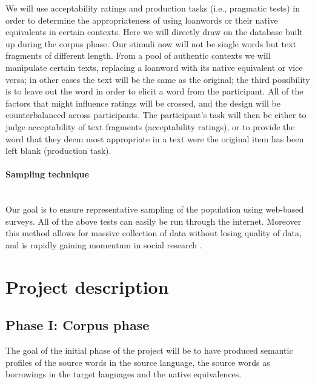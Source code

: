 \documentclass[a4paper]{article}
\begin{document}
We will use acceptability ratings and production tasks (i.e., pragmatic tests) in order to determine the appropriateness of using loanwords or their native equivalents in certain contexts.
Here we will directly draw on the database built up during the corpus phase.
Our stimuli now will not be single words but text fragments of different length.
From a pool of authentic contexts we will manipulate certain texts, replacing a loanword with its native equivalent or vice versa; in other cases the text will be the same as the original; the third possibility is to leave out the word in order to elicit a word from the participant.
All of the factors that might influence ratings will be crossed, and the design will be counterbalanced across participants.
The participant's task will then be either to judge acceptability of text fragments (acceptability ratings), or to provide the word that they deem most appropriate in a text were the original item has been left blank (production task).


\paragraph{Sampling technique}
\hspace{0pt} \\
Our goal is to ensure representative sampling of the population using web-based surveys.
All of the above tests can easily be run through the internet.
Moreover this method allows for massive collection of data without losing quality of data, and is rapidly gaining momentum in social research \citep{Denscombe2010}.










\section{Project description}



\subsection{Phase I: Corpus phase}
\label{sect_corpus}

The goal of the initial phase of the project will be to have produced semantic profiles of the source words in the source language, the source words as borrowings in the target languages and the native equivalences. 
\end{document}
